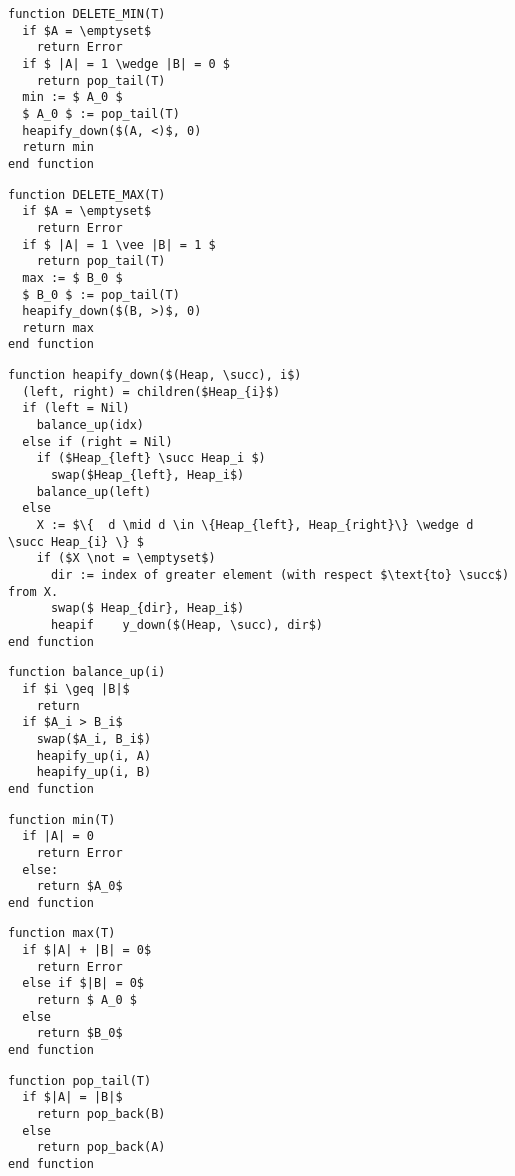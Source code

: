 \documentclass[12pt,a4paper]{article}
\theoremstyle{plain}
\begin{document}
\begin{lstlisting}[mathescape]
function DELETE_MIN(T) 
  if $A = \emptyset$
    return Error
  if $ |A| = 1 \wedge |B| = 0 $
    return pop_tail(T)
  min := $ A_0 $
  $ A_0 $ := pop_tail(T) 
  heapify_down($(A, <)$, 0)
  return min
end function
\end{lstlisting}

\begin{lstlisting}[mathescape]
function DELETE_MAX(T) 
  if $A = \emptyset$
    return Error
  if $ |A| = 1 \vee |B| = 1 $
    return pop_tail(T)
  max := $ B_0 $
  $ B_0 $ := pop_tail(T) 
  heapify_down($(B, >)$, 0)
  return max
end function
\end{lstlisting}

\begin{lstlisting}[mathescape]
function heapify_down($(Heap, \succ), i$)
  (left, right) = children($Heap_{i}$)
  if (left = Nil)
    balance_up(idx)
  else if (right = Nil)
    if ($Heap_{left} \succ Heap_i $)
      swap($Heap_{left}, Heap_i$)
    balance_up(left)
  else 
    X := $\{  d \mid d \in \{Heap_{left}, Heap_{right}\} \wedge d \succ Heap_{i} \} $
    if ($X \not = \emptyset$) 
      dir := index of greater element (with respect $\text{to} \succ$) from X.
      swap($ Heap_{dir}, Heap_i$)
      heapif	y_down($(Heap, \succ), dir$)
end function
\end{lstlisting}

\begin{lstlisting}[mathescape]
function balance_up(i)
  if $i \geq |B|$
    return
  if $A_i > B_i$
    swap($A_i, B_i$)
    heapify_up(i, A)
    heapify_up(i, B)
end function
\end{lstlisting}

\begin{lstlisting}[mathescape]
function min(T)
  if |A| = 0
    return Error
  else:
    return $A_0$
end function
\end{lstlisting}

\begin{lstlisting}[mathescape]
function max(T)
  if $|A| + |B| = 0$
    return Error
  else if $|B| = 0$
    return $ A_0 $
  else 
    return $B_0$
end function
\end{lstlisting}

\begin{lstlisting}[mathescape]
function pop_tail(T)
  if $|A| = |B|$
    return pop_back(B)
  else 
    return pop_back(A)
end function
\end{lstlisting}
\end{document}

